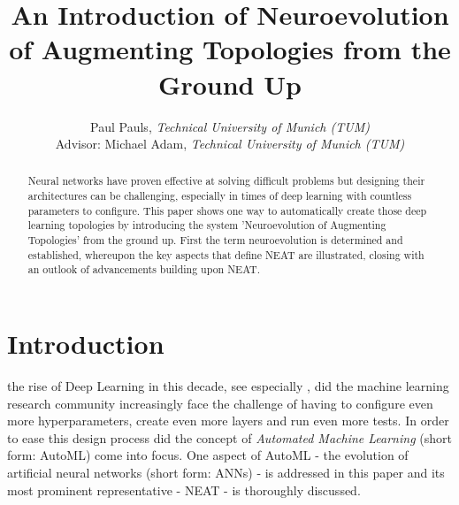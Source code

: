 \documentclass[journal, a4paper]{IEEEtran}
\begin{document}
\title{An Introduction of Neuroevolution of Augmenting Topologies from the Ground Up}
\author{Paul Pauls, \textit{Technical University of Munich (TUM)}\\
        Advisor: Michael Adam, \textit{Technical University of Munich (TUM)}}
\maketitle




\begin{abstract}
    Neural networks have proven effective at solving difficult problems but designing their architectures can be challenging, especially in times of deep learning with countless parameters to configure. This paper shows one way to automatically create those deep learning topologies by introducing the system 'Neuroevolution of Augmenting Topologies' from the ground up. First the term neuroevolution is determined and established, whereupon the key aspects that define NEAT are illustrated, closing with an outlook of advancements building upon NEAT.
\end{abstract}




\section{Introduction}

 the rise of Deep Learning in this decade, see especially \cite{kri12, cir12, sch14}, did the machine learning research community increasingly face the challenge of having to configure even more hyperparameters, create even more layers and run even more tests. In order to ease this design process did the concept of \textit{Automated Machine Learning} (short form: AutoML) come into focus. One aspect of AutoML - the evolution of artificial neural networks (short form: ANNs) - is addressed in this paper and its most prominent representative - NEAT - is thoroughly discussed. 
\end{document}
